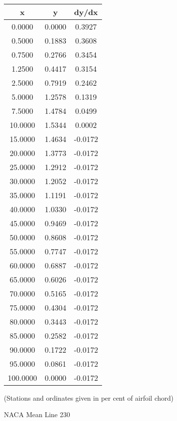 \documentclass[11pt]{book}
\begin{document}
 \vspace{8mm}
 \begin{tabular}{|c|c|c|}  \hline
 x & y & dy/dx \\
 \hline
0.0000 & 0.0000 & 0.3927 \\
0.5000 & 0.1883 & 0.3608 \\
0.7500 & 0.2766 & 0.3454 \\
1.2500 & 0.4417 & 0.3154 \\
2.5000 & 0.7919 & 0.2462 \\
5.0000 & 1.2578 & 0.1319 \\
7.5000 & 1.4784 & 0.0499 \\
10.0000 & 1.5344 & 0.0002 \\
15.0000 & 1.4634 & -0.0172 \\
20.0000 & 1.3773 & -0.0172 \\
25.0000 & 1.2912 & -0.0172 \\
30.0000 & 1.2052 & -0.0172 \\
35.0000 & 1.1191 & -0.0172 \\
40.0000 & 1.0330 & -0.0172 \\
45.0000 & 0.9469 & -0.0172 \\
50.0000 & 0.8608 & -0.0172 \\
55.0000 & 0.7747 & -0.0172 \\
60.0000 & 0.6887 & -0.0172 \\
65.0000 & 0.6026 & -0.0172 \\
70.0000 & 0.5165 & -0.0172 \\
75.0000 & 0.4304 & -0.0172 \\
80.0000 & 0.3443 & -0.0172 \\
85.0000 & 0.2582 & -0.0172 \\
90.0000 & 0.1722 & -0.0172 \\
95.0000 & 0.0861 & -0.0172 \\
100.0000 & 0.0000 & -0.0172 \\
 \hline
 \end{tabular}
 \vspace{8mm}

(Stations and ordinates given in per cent of airfoil chord)

 \newpage
 \label{ml230}
 \begin{Large}
 NACA Mean Line 230
 \end{Large}
  
\end{document}

